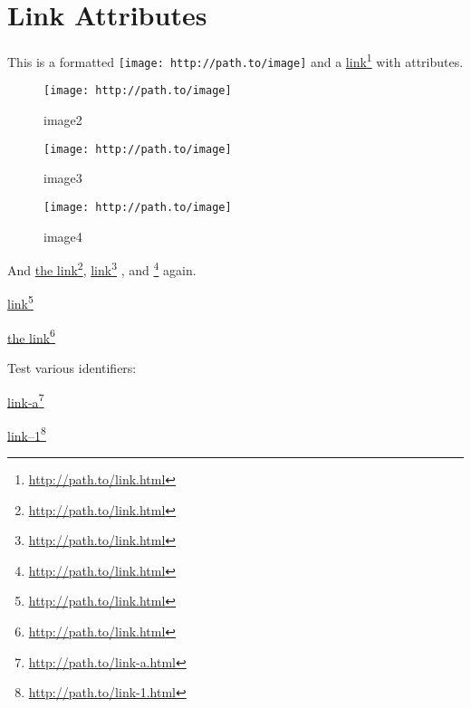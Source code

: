
\def\mytitle{Link Attributes Test}


\part{Link Attributes}
\label{linkattributes}

This is a formatted \texttt{[image: http://path.to/image]} and a \href{http://path.to/link.html}{link}\footnote{\href{http://path.to/link.html}{http:/\slash path.to\slash link.html}} with attributes.

\begin{figure}[htbp]
\centering
\texttt{[image: http://path.to/image]}
\caption{image2}
\label{image2}
\end{figure}

\begin{figure}[htbp]
\centering
\texttt{[image: http://path.to/image]}
\caption{image3}
\label{image3}
\end{figure}

\begin{figure}[htbp]
\centering
\texttt{[image: http://path.to/image]}
\caption{image4}
\label{image4}
\end{figure}

And \href{http://path.to/link.html}{the link}\footnote{\href{http://path.to/link.html}{http:/\slash path.to\slash link.html}}, \href{http://path.to/link.html}{link}\footnote{\href{http://path.to/link.html}{http:/\slash path.to\slash link.html}} , and \href{http://path.to/link.html}{}\footnote{\href{http://path.to/link.html}{http:/\slash path.to\slash link.html}} again.

\href{http://path.to/link.html}{link}\footnote{\href{http://path.to/link.html}{http:/\slash path.to\slash link.html}}

\href{http://path.to/link.html}{the link}\footnote{\href{http://path.to/link.html}{http:/\slash path.to\slash link.html}}

Test various identifiers:

\href{http://path.to/link-a.html}{link-a}\footnote{\href{http://path.to/link-a.html}{http:/\slash path.to\slash link-a.html}}

\href{http://path.to/link-1.html}{link--1}\footnote{\href{http://path.to/link-1.html}{http:/\slash path.to\slash link-1.html}}

